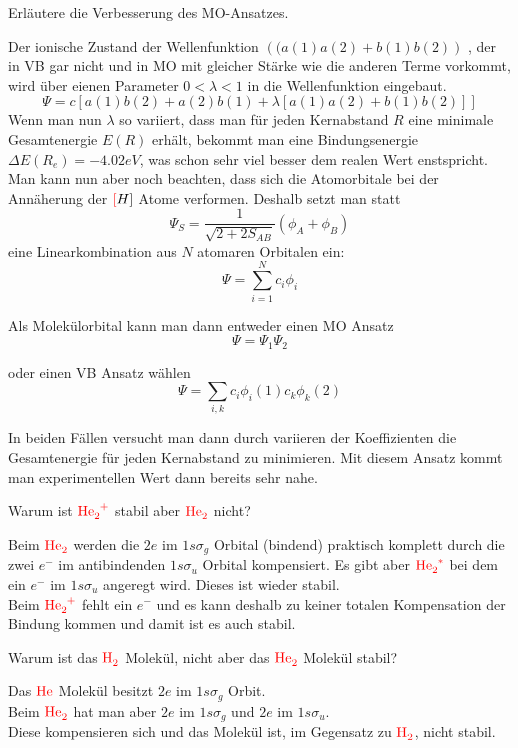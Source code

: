 \documentclass[a5paper,12pt,ngerman,print,grid=front]{kartei}
\let\oldce\ce
\renewcommand*{\ce}[1]{\begingroup\color{red}\oldce{#1}\endgroup}
\begin{document}
	
	\begin{karte}{
		Erläutere die Verbesserung des MO-Ansatzes.
		}

		Der ionische Zustand der Wellenfunktion $\left(  (a(1)a(2) + b(1)b(2) \right) $
		, der in VB gar nicht und in MO mit gleicher Stärke wie die anderen Terme vorkommt, wird über eienen Parameter $ 0 < \lambda < 1 $ in die Wellenfunktion eingebaut.
		$$ \Psi = c[ a(1)b(2) + a(2)b(1) + \lambda[ a(1)a(2) + b(1)b(2) ] ] $$
		Wenn man nun $\lambda$ so variiert, dass man für jeden Kernabstand $R$ eine minimale Gesamtenergie $E(R)$ erhält, bekommt man eine Bindungsenergie $ \Delta E(R_e) = -4.02eV $, was schon sehr viel besser dem realen Wert enstspricht.
		Man kann nun aber noch beachten, dass sich die Atomorbitale bei der Annäherung der $\ce[H]$ Atome verformen. Deshalb setzt man statt 
		$$ \Psi_S = \frac{1}{\sqrt{2+2S_{AB}}} (\phi_A + \phi_B) $$
		eine Linearkombination aus $N$ atomaren Orbitalen ein:
		$$ \Psi = \sum_{i=1}^{N} c_i\phi_i $$
		
		Als Molekülorbital kann man dann entweder einen MO Ansatz $$\Psi = \Psi_1 \Psi_2$$
		
		oder einen VB Ansatz wählen $$ \Psi = \sum_{i,k} c_i\phi_i(1)c_k\phi_k(2) $$
		
		In beiden Fällen versucht man dann durch variieren der Koeffizienten die Gesamtenergie für jeden Kernabstand zu minimieren. Mit diesem Ansatz kommt man experimentellen Wert dann bereits sehr nahe.
		
	\end{karte}
	
	
	\begin{karte}{
		Warum ist $\ce{He2+}$ stabil aber $\ce{He2}$ nicht?
		}
		
		Beim $\ce{He2}$ werden die $2e$ im $1s \sigma_g$ Orbital (bindend) praktisch komplett durch die zwei $e^-$ im antibindenden $1s\sigma_u$ Orbital kompensiert. 
		Es gibt aber $\ce{He2^*}$ bei dem ein $e^-$ im $1s\sigma_u$ angeregt wird. 
		Dieses ist wieder stabil. \\
		
		Beim $\ce{He2^+}$ fehlt ein $e^-$ und es kann deshalb zu keiner totalen Kompensation der Bindung kommen und damit ist es auch stabil.
				
	\end{karte}


	\begin{karte}{
		Warum ist das $\ce{H2}$ Molekül, nicht aber das $\ce{He2}$ Molekül stabil?
		}
		
		Das $\ce{He}$ Molekül besitzt $2e$ im $1s\sigma_g$ Orbit. \\
		Beim $ \ce{He2} $ hat man aber $2e$ im $1s \sigma_g$ und $2e$ im $1s\sigma_u$. \\
		Diese kompensieren sich und das Molekül ist, im Gegensatz zu $\ce{H2}$, nicht stabil.
		
	\end{karte}
\end{document}
